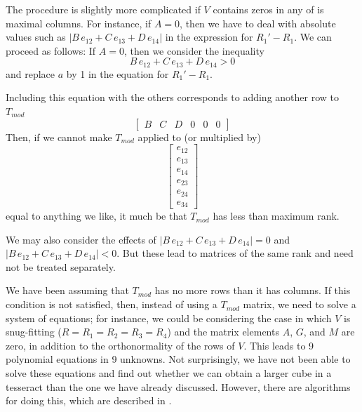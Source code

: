 The procedure is slightly more complicated if $V$ contains zeros in any of is
maximal columns.  For instance, if $A = 0$, then we have to deal with absolute
values such as $|B\,e_{12}+C\,e_{13}+D\,e_{14}|$ in the expression for $R_1' -
R_1$.  We can proceed as follows:  If $A = 0$, then we consider the inequality
\begin{equation*}
B\,e_{12}+C\,e_{13}+D\,e_{14} > 0
\end{equation*}
and replace $a$ by 1 in the equation for $R_1' - R_1$.

Including this equation with the others corresponds to adding another row to
$T_{mod}$
\begin{equation*}
\begin{bmatrix}
B & C & D & 0 & 0 & 0
\end{bmatrix}
\end{equation*}
Then, if we cannot make $T_{mod}$ applied to (or multiplied by)
\begin{equation*}
\begin{bmatrix}
e_{12} \\
e_{13} \\
e_{14} \\
e_{23} \\
e_{24} \\
e_{34} 
\end{bmatrix}
\end{equation*}
equal to anything we like, it much be that $T_{mod}$ has less than maximum
rank.

We may also consider the effects of $|B\,e_{12}+C\,e_{13}+D\,e_{14}| = 0$ and
$|B\,e_{12}+C\,e_{13}+D\,e_{14}| < 0$.  But these lead to matrices of the same
rank and need not be treated separately.

We have been assuming that $T_{mod}$ has no more rows than it has
columns. If this condition is not satisfied, then, instead of using a
$T_{mod}$
matrix, we need to solve a system of equations; for instance, we could be
considering the case in which $V$ is snug-fitting ($R = R_1 = R_2 = R_3 = R_4$)
and the matrix elements $A$, $G$, and $M$ are zero, in addition to the
orthonormality of the rows of $V$. This leads to 9 polynomial equations in 9
unknowns. Not surprisingly, we have not been able to solve these
equations and find out whether we can obtain a larger cube in a tesseract
than the one we have already discussed. However, there are algorithms
for doing this, which are described in \cite{cox1992}.

